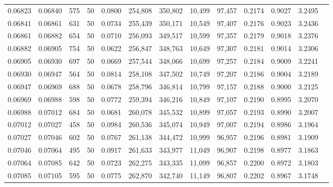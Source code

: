 \begin{tabular}{rrrrrrrrrrrrr}
0.06823 & 0.06840 &   575 &  50 &                                     0.0800 & 254,808 & 350,802 &  10,499 &  97,457 & 0.2174 & 0.9027 & 3.2495 \\
0.06841 & 0.06861 &   631 &  50 &                                     0.0734 & 255,439 & 350,171 &  10,549 &  97,407 & 0.2176 & 0.9023 & 3.2436 \\
0.06861 & 0.06882 &   654 &  50 &                                     0.0710 & 256,093 & 349,517 &  10,599 &  97,357 & 0.2179 & 0.9018 & 3.2376 \\
0.06882 & 0.06905 &   754 &  50 &                                     0.0622 & 256,847 & 348,763 &  10,649 &  97,307 & 0.2181 & 0.9014 & 3.2306 \\
0.06905 & 0.06930 &   697 &  50 &                                     0.0669 & 257,544 & 348,066 &  10,699 &  97,257 & 0.2184 & 0.9009 & 3.2241 \\
0.06930 & 0.06947 &   564 &  50 &                                     0.0814 & 258,108 & 347,502 &  10,749 &  97,207 & 0.2186 & 0.9004 & 3.2189 \\
0.06947 & 0.06969 &   688 &  50 &                                     0.0678 & 258,796 & 346,814 &  10,799 &  97,157 & 0.2188 & 0.9000 & 3.2125 \\
0.06969 & 0.06988 &   598 &  50 &                                     0.0772 & 259,394 & 346,216 &  10,849 &  97,107 & 0.2190 & 0.8995 & 3.2070 \\
0.06988 & 0.07012 &   684 &  50 &                                     0.0681 & 260,078 & 345,532 &  10,899 &  97,057 & 0.2193 & 0.8990 & 3.2007 \\
0.07012 & 0.07027 &   458 &  50 &                                     0.0984 & 260,536 & 345,074 &  10,949 &  97,007 & 0.2194 & 0.8986 & 3.1964 \\
0.07027 & 0.07046 &   602 &  50 &                                     0.0767 & 261,138 & 344,472 &  10,999 &  96,957 & 0.2196 & 0.8981 & 3.1909 \\
0.07046 & 0.07064 &   495 &  50 &                                     0.0917 & 261,633 & 343,977 &  11,049 &  96,907 & 0.2198 & 0.8977 & 3.1863 \\
0.07064 & 0.07085 &   642 &  50 &                                     0.0723 & 262,275 & 343,335 &  11,099 &  96,857 & 0.2200 & 0.8972 & 3.1803 \\
0.07085 & 0.07105 &   595 &  50 &                                     0.0775 & 262,870 & 342,740 &  11,149 &  96,807 & 0.2202 & 0.8967 & 3.1748 \\

\end{tabular}
